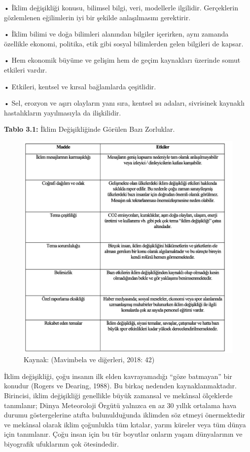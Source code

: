 \documentclass[
]{book}
\begin{document}
• İklim değişikliği konusu, bilimsel bilgi, veri, modellerle ilgilidir. Gerçeklerin gözlemlenen eğilimlerin iyi bir şekilde anlaşılmasını gerektirir.

• İklim bilimi ve doğa bilimleri alanından bilgiler içerirken, aynı zamanda özellikle ekonomi, politika, etik gibi sosyal bilimlerden gelen bilgileri de kapsar.

• Hem ekonomik büyüme ve gelişim hem de geçim kaynakları üzerinde somut etkileri vardır.

• Etkileri, kentsel ve kırsal bağlamlarda çeşitlidir.

• Sel, erozyon ve aşırı olayların yanı sıra, kentsel ısı adaları, sivrisinek kaynaklı hastalıkların yayılmasıyla da ilişkilidir.

\textbf{Tablo 3.1:} İklim Değişikliğinde Görülen Bazı Zorluklar.

\begin{figure}
\includegraphics[width=0.95\linewidth,height=0.95\textheight]{tablolar-sekiller/tablo-3-1} \caption{Kaynak: (Mavimbela ve diğerleri, 2018: 42)}\label{fig:unnamed-chunk-3}
\end{figure}

İklim değişikliği, çoğu insanın ilk elden kavrayamadığı ``göze batmayan'' bir konudur (Rogers ve Dearing, 1988). Bu birkaç nedenden kaynaklanmaktadır. Birincisi, iklim değişikliği genellikle büyük zamansal ve mekânsal ölçeklerde tanımlanır; Dünya Meteoroloji Örgütü yalnızca en az 30 yıllık ortalama hava durumu göstergelerine atıfta bulunulduğunda iklimden söz etmeyi önermektedir ve mekânsal olarak iklim çoğunlukla tüm kıtalar, yarım küreler veya tüm dünya için tanımlanır. Çoğu insan için bu tür boyutlar onların yaşam dünyalarının ve biyografik ufuklarının çok ötesindedir. \citep{schaefer2014media}
\end{document}

